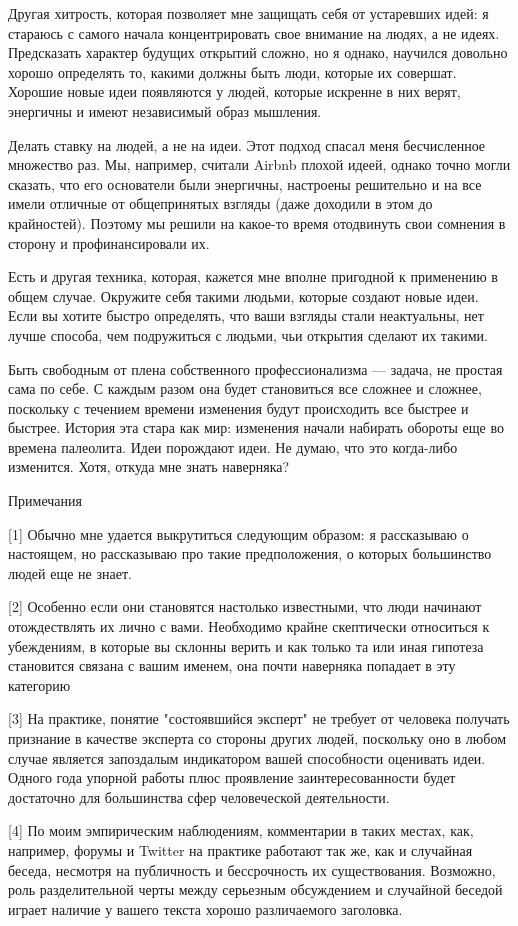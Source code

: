 \documentclass[ebook,12pt,oneside,openany]{memoir}
\begin{document}
Другая хитрость, которая позволяет мне защищать себя от устаревших
идей: я стараюсь с самого начала концентрировать свое внимание на
людях, а не идеях. Предсказать характер будущих открытий сложно, но я
однако, научился довольно хорошо определять то, какими должны быть
люди, которые их совершат. Хорошие новые идеи появляются у людей,
которые искренне в них верят, энергичны и имеют независимый образ
мышления.

Делать ставку на людей, а не на идеи. Этот подход спасал меня
бесчисленное множество раз. Мы, например, считали Airbnb плохой идеей,
однако точно могли сказать, что его основатели были энергичны,
настроены решительно и на все имели отличные от общепринятых взгляды
(даже доходили в этом до крайностей). Поэтому мы решили на какое-то
время отодвинуть свои сомнения в сторону и профинансировали их.

Есть и другая техника, которая, кажется мне вполне пригодной к
применению в общем случае. Окружите себя такими людьми, которые
создают новые идеи. Если вы хотите быстро определять, что ваши взгляды
стали неактуальны, нет лучше способа, чем подружиться с людьми, чьи
открытия сделают их такими.

Быть свободным от плена собственного профессионализма — задача, не
простая сама по себе. С каждым разом она будет становиться все сложнее
и сложнее, поскольку с течением времени изменения будут происходить
все быстрее и быстрее. История эта стара как мир: изменения начали
набирать обороты еще во времена палеолита. Идеи порождают идеи. Не
думаю, что это когда-либо изменится. Хотя, откуда мне знать наверняка?

Примечания

[1] Обычно мне удается выкрутиться следующим образом: я рассказываю о
настоящем, но рассказываю про такие предположения, о которых
большинство людей еще не знает.

[2] Особенно если они становятся настолько известными, что люди
начинают отождествлять их лично с вами. Необходимо крайне скептически
относиться к убеждениям, в которые вы склонны верить и как только та
или иная гипотеза становится связана с вашим именем, она почти
наверняка попадает в эту категорию

[3] На практике, понятие "состоявшийся эксперт" не требует от человека
получать признание в качестве эксперта со стороны других людей,
поскольку оно в любом случае является запоздалым индикатором вашей
способности оценивать идеи. Одного года упорной работы плюс проявление
заинтересованности будет достаточно для большинства сфер человеческой
деятельности.

[4] По моим эмпирическим наблюдениям, комментарии в таких местах, как,
например, форумы и Twitter на практике работают так же, как и
случайная беседа, несмотря на публичность и бессрочность их
существования. Возможно, роль разделительной черты между серьезным
обсуждением и случайной беседой играет наличие у вашего текста хорошо
различаемого заголовка.
\end{document}
